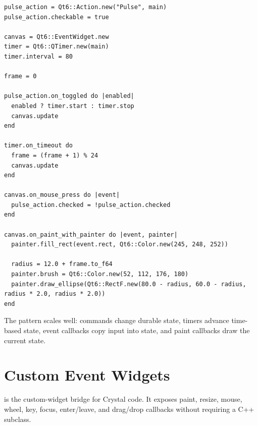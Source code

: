 \begin{lstlisting}[style=crystal]
pulse_action = Qt6::Action.new("Pulse", main)
pulse_action.checkable = true

canvas = Qt6::EventWidget.new
timer = Qt6::QTimer.new(main)
timer.interval = 80

frame = 0

pulse_action.on_toggled do |enabled|
  enabled ? timer.start : timer.stop
  canvas.update
end

timer.on_timeout do
  frame = (frame + 1) % 24
  canvas.update
end

canvas.on_mouse_press do |event|
  pulse_action.checked = !pulse_action.checked
end

canvas.on_paint_with_painter do |event, painter|
  painter.fill_rect(event.rect, Qt6::Color.new(245, 248, 252))

  radius = 12.0 + frame.to_f64
  painter.brush = Qt6::Color.new(52, 112, 176, 180)
  painter.draw_ellipse(Qt6::RectF.new(80.0 - radius, 60.0 - radius, radius * 2.0, radius * 2.0))
end
\end{lstlisting}

The pattern scales well: commands change durable state, timers advance time-based state, event callbacks copy input into state, and paint callbacks draw the current state.

\section{Custom Event Widgets}

 is the custom-widget bridge for Crystal code. It exposes paint, resize, mouse, wheel, key, focus, enter/leave, and drag/drop callbacks without requiring a C++ subclass.

